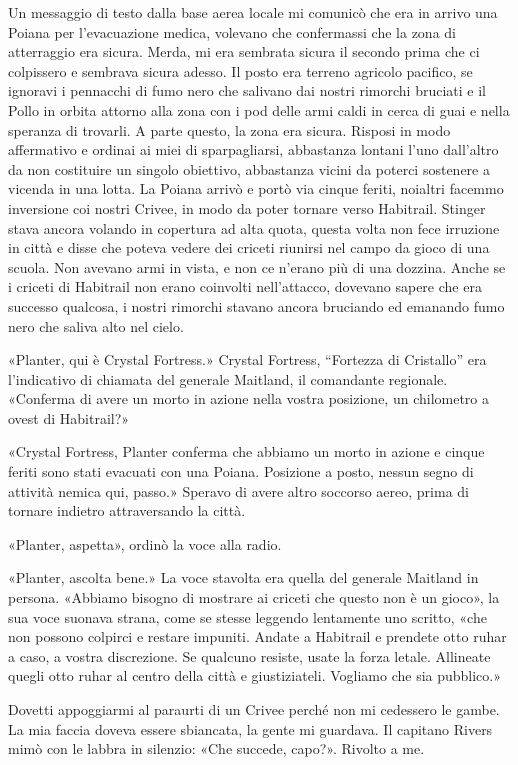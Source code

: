 Un messaggio di testo dalla base aerea locale mi comunicò che era in
arrivo una Poiana per l'evacuazione medica, volevano che confermassi che
la zona di atterraggio era sicura. Merda, mi era sembrata sicura il
secondo prima che ci colpissero e sembrava sicura adesso. Il posto era
terreno agricolo pacifico, se ignoravi i pennacchi di fumo nero che
salivano dai nostri rimorchi bruciati e il Pollo in orbita attorno alla
zona con i pod delle armi caldi in cerca di guai e nella speranza di
trovarli. A parte questo, la zona era sicura. Risposi in modo
affermativo e ordinai ai miei di sparpagliarsi, abbastanza lontani l'uno
dall'altro da non costituire un singolo obiettivo, abbastanza vicini da
poterci sostenere a vicenda in una lotta. La Poiana arrivò e portò via
cinque feriti, noialtri facemmo inversione coi nostri Crivee, in modo da
poter tornare verso Habitrail. Stinger stava ancora volando in copertura
ad alta quota, questa volta non fece irruzione in città e disse che
poteva vedere dei criceti riunirsi nel campo da gioco di una scuola. Non
avevano armi in vista, e non ce n'erano più di una dozzina. Anche se i
criceti di Habitrail non erano coinvolti nell'attacco, dovevano sapere
che era successo qualcosa, i nostri rimorchi stavano ancora bruciando ed
emanando fumo nero che saliva alto nel cielo.

«Planter, qui è Crystal Fortress.» Crystal Fortress, ``Fortezza di
Cristallo'' era l'indicativo di chiamata del generale Maitland, il
comandante regionale. «Conferma di avere un morto in azione nella vostra
posizione, un chilometro a ovest di Habitrail?»

«Crystal Fortress, Planter conferma che abbiamo un morto in azione e
cinque feriti sono stati evacuati con una Poiana. Posizione a posto,
nessun segno di attività nemica qui, passo.» Speravo di avere altro
soccorso aereo, prima di tornare indietro attraversando la città.

«Planter, aspetta», ordinò la voce alla radio.

«Planter, ascolta bene.» La voce stavolta era quella del generale
Maitland in persona. «Abbiamo bisogno di mostrare ai criceti che questo
non è un gioco», la sua voce suonava strana, come se stesse leggendo
lentamente uno scritto, «che non possono colpirci e restare impuniti.
Andate a Habitrail e prendete otto ruhar a caso, a vostra discrezione.
Se qualcuno resiste, usate la forza letale. Allineate quegli otto ruhar
al centro della città e giustiziateli. Vogliamo che sia pubblico.»

Dovetti appoggiarmi al paraurti di un Crivee perché non mi cedessero le
gambe. La mia faccia doveva essere sbiancata, la gente mi guardava. Il
capitano Rivers mimò con le labbra in silenzio: «Che succede, capo?».
Rivolto a me.

